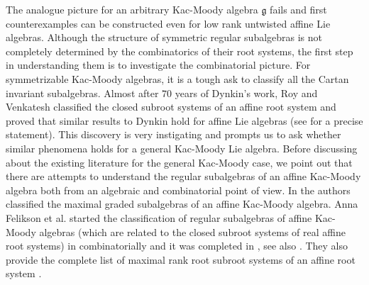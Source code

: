 \documentclass[12pt,reqno]{amsart}
\theoremstyle{plain}
\theoremstyle{definition}
\theoremstyle{remark}
\newcommand{\lie}[1]{\mathfrak{#1}}
\begin{document}
 The analogue picture for an arbitrary Kac-Moody algebra $\lie g$ fails and first counterexamples can be constructed even for low rank untwisted affine Lie algebras. Although the structure of symmetric regular subalgebras is not completely determined by the combinatorics of their root systems, the first step in understanding them is to investigate the combinatorial picture. For symmetrizable Kac-Moody algebras, it is a tough ask to classify all the Cartan invariant subalgebras. Almost after $70$ years of Dynkin's work, Roy and Venkatesh classified the closed subroot systems of an affine root system and proved that similar results to Dynkin hold for affine Lie algebras (see \cite[Theorem 11.3.1]{roy2019maximal} for a precise statement). This discovery is very instigating and prompts us to ask whether similar phenomena holds for a general Kac-Moody Lie algebra. Before discussing about the existing literature for the general Kac-Moody case, we point out that there are attempts to understand the regular subalgebras of an affine Kac-Moody algebra both from an algebraic and combinatorial point of view. In \cite{barnea1998graded} the authors classified the maximal graded subalgebras of an affine Kac-Moody algebra. Anna Felikson et al. started the classification of regular subalgebras of affine Kac-Moody algebras (which are related to the closed subroot systems of real affine root systems) in \cite{felikson2008regular} combinatorially and it was completed in \cite{roy2019maximal}, see also \cite{KV21a}. They also provide the complete list of maximal rank root subroot systems of an affine root system \cite[Table 1]{felikson2008regular}.
 
\end{document}
